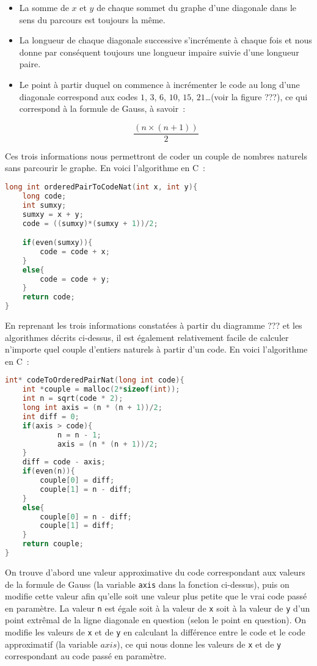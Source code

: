 \documentclass{article}
\begin{document}
\begin{itemize}
\item La somme de $x$ et $y$ de chaque sommet du graphe d'une diagonale dans le sens du parcours est toujours la même.
\item La longueur de chaque diagonale successive s'incrémente à chaque fois et nous donne par conséquent toujours une longueur impaire suivie d'une longueur paire.
\item Le point à partir duquel on commence à incrémenter le code au long d'une diagonale correspond aux codes $1$, $3$, $6$, $10$, $15$, $21$\ldots (voir la figure ???), ce qui correspond à la formule de Gauss, à savoir~:

$$\dfrac{(n \times (n + 1))}{2}$$
\end{itemize}

Ces trois informations nous permettront de coder un couple de nombres naturels sans parcourir le graphe. En voici l'algorithme en C~:

\begin{lstlisting}[language=C]
long int orderedPairToCodeNat(int x, int y){
	long code;
	int sumxy; 
	sumxy = x + y;
	code = ((sumxy)*(sumxy + 1))/2;

	if(even(sumxy)){
		code = code + x;
	}
	else{
		code = code + y; 
	}
	return code;
}
\end{lstlisting}


En reprenant les trois informations constatées à partir du diagramme ??? et les algorithmes décrits ci-dessus, il est également relativement facile de calculer n'importe quel couple d'entiers naturels à partir d'un code. En voici l'algorithme en C~:

\begin{lstlisting}[language=C]
int* codeToOrderedPairNat(long int code){
	int *couple = malloc(2*sizeof(int));
	int n = sqrt(code * 2);
	long int axis = (n * (n + 1))/2;
	int diff = 0;
	if(axis > code){
			n = n - 1;
			axis = (n * (n + 1))/2;
	}
	diff = code - axis;
	if(even(n)){
		couple[0] = diff;
		couple[1] = n - diff;
	}
	else{
		couple[0] = n - diff;
		couple[1] = diff;
	}
	return couple;
}
\end{lstlisting}

On trouve d'abord une valeur approximative du code correspondant aux valeurs de la formule de Gauss (la variable \lstinline!axis! dans la fonction ci-dessus), puis on modifie cette valeur afin qu'elle soit une valeur plus petite que le vrai code passé en paramètre. La valeur \lstinline!n! est égale soit à la valeur de \lstinline!x! soit à la valeur de \lstinline!y! d'un point extrêmal de la ligne diagonale en question (selon le point en question). On modifie les valeurs de \lstinline!x! et de \lstinline!y! en calculant la différence entre le code et le code approximatif (la variable $axis$), ce qui nous donne les valeurs de \lstinline!x! et de \lstinline!y! correspondant au code passé en paramètre.
\end{document}
